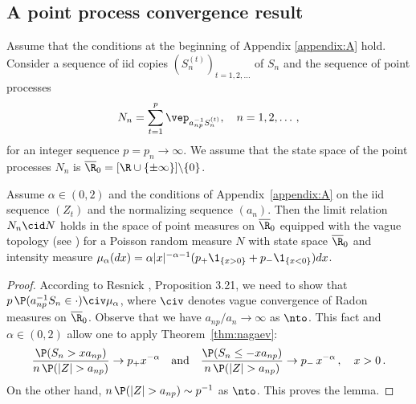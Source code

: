 \subsection{A point process convergence result}
Assume that the conditions at the beginning of Appendix \ref{appendix:A} hold.
Consider a sequence of iid copies $(S_{n}^{(t)})_{t=1,2,\ldots}$
of $S_n$ and the sequence of point processes
\begin{equation*}
N_n= \sum_{t=1}^{p} \vep_{a_{np}^{-1} S_{n}^{(t)}}, \quad n=1,2,\ldots\,,
\end{equation*}
for an integer sequence $p=p_n\to\infty$. We assume that the state space of the
point processes $N_n$ is $\overline{\R}_0=[\R\cup\{\pm \infty\}]\backslash \{0\}$.
\begin{lemma}\label{lem:ppr} 
Assume $\alpha \in (0,2)$ and the
conditions of  Appendix~\ref{appendix:A}
on the iid sequence $(Z_t)$ and the normalizing sequence $(a_n)$. Then the limit relation
$N_n\cid N$ holds in the space of point measures on $\overline{\R}_0$
equipped with the vague topology (see
\cite{resnick:1987,resnick:2007})
for a  Poisson random measure $N$ with state space $\overline{\R}_0$ and intensity measure $\mu_\alpha(dx)=\alpha |x|^{-\alpha-1} (p_+ \1_{\{x>0\}}+ p_- \1_{\{x<0\}}) 
dx$.
\end{lemma}
\begin{proof}
According to Resnick \cite{resnick:1987}, Proposition 3.21, we need to
show that
$p\, \P(a_{np}^{-1}S_n\in \cdot)\civ \mu_\alpha
$,
where $\civ$ denotes vague convergence of Radon measures on  $\overline{\R}_0$.
Observe that we have $a_{np}/a_n\to\infty$ as $\nto$. This fact and
$\alpha\in (0,2)$ allow one to apply
Theorem~\ref{thm:nagaev}:
\begin{equation*}
\dfrac{\P( S_n >x a_{np})}{n\,\P(|Z|>  a_{np})}\to p_+ x^{-\alpha}
\quad \mbox{and}\quad \dfrac{\P( S_n \le -x a_{np})}{n\,\P(|Z|>
  a_{np})}\to p_-\, x^{-\alpha}\,,\quad x>0\,.
\end{equation*}
On the other hand, $n\,\P(|Z|>  a_{np})\sim p^{-1}$ as $\nto$.
This proves the lemma.
\end{proof}







